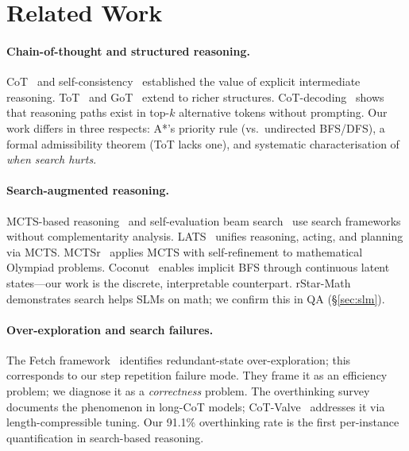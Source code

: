 \documentclass[11pt]{article}
\begin{document}
\section{Related Work}
\label{sec:related}

\paragraph{Chain-of-thought and structured reasoning.}
CoT~\citep{wei2022chain} and self-consistency~\citep{wang2023self} established the value of explicit intermediate reasoning. ToT~\citep{yao2024tree} and GoT~\citep{besta2024graph} extend to richer structures. CoT-decoding~\citep{wang2024chain} shows that reasoning paths exist in top-$k$ alternative tokens without prompting. Our work differs in three respects: A*'s priority rule (vs.\ undirected BFS/DFS), a formal admissibility theorem (ToT lacks one), and systematic characterisation of \emph{when search hurts}.

\paragraph{Search-augmented reasoning.}
MCTS-based reasoning~\citep{hao2023reasoning} and self-evaluation beam search~\citep{xie2024self} use search frameworks without complementarity analysis. LATS~\citep{zhou2024language} unifies reasoning, acting, and planning via MCTS. MCTSr~\citep{zhang2024accessing} applies MCTS with self-refinement to mathematical Olympiad problems. Coconut~\citep{hao2024training} enables implicit BFS through continuous latent states---our work is the discrete, interpretable counterpart. rStar-Math~\citep{guan2025rstar} demonstrates search helps SLMs on math; we confirm this in QA (\S\ref{sec:slm}).

\paragraph{Over-exploration and search failures.}
The Fetch framework~\citep{zhang2025streamlined} identifies redundant-state over-exploration; this corresponds to our step repetition failure mode. They frame it as an efficiency problem; we diagnose it as a \emph{correctness} problem. The overthinking survey~\citep{zhang2025survey} documents the phenomenon in long-CoT models; CoT-Valve~\citep{ma2025cotvalve} addresses it via length-compressible tuning. Our 91.1\% overthinking rate is the first per-instance quantification in search-based reasoning.
\end{document}
